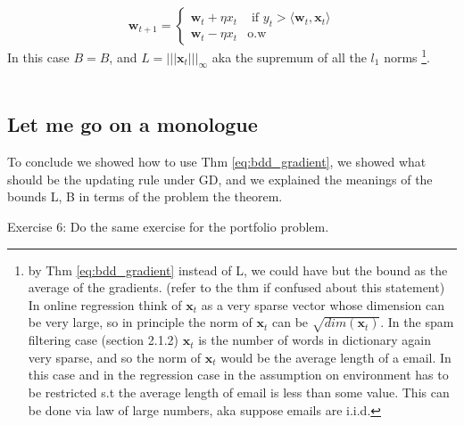 \documentclass[11pt]{article}
\theoremstyle{quest}
\begin{document}
\begin{tcolorbox}
$$\mathbf{w}_{t+1}=\begin{cases} \mathbf{w}_t +\eta x_t   & \text{ if } y_t > \langle \mathbf{w}_t, \mathbf{x}_t \rangle\\
 \mathbf{w}_t -\eta x_t  & \text{o.w}
\end{cases}$$
In this case $B=B$, and $L = |||\mathbf{x}_t|||_\infty$ aka the supremum of all the $l_1$ norms \footnote{by {\color{blue} Thm \eqref{eq:bdd_gradient}} instead of L, we could have but the bound as the average of the gradients. (refer to the thm if confused about this statement) In online regression think of $\mathbf{x}_t$ as a very sparse vector whose dimension can be very large, so in principle the norm of $\mathbf{x}_t$ can be $\sqrt{dim(\mathbf{x}_t)}$. In the spam filtering case (section 2.1.2) $\mathbf{x}_t$ is the number of words in dictionary again very sparse, and so the norm of $\mathbf{x}_t$ would be the average length of a email. In this case and in the regression case in the assumption on environment has to be restricted s.t the average length of email is less than some value. This can be done via law of large numbers, aka suppose emails are i.i.d. }. \\ \\ 

\end{tcolorbox}

\subsection{Let me go on a monologue}
To conclude we showed how to use {\color{blue} Thm \eqref{eq:bdd_gradient}}, we showed what should be the updating rule under  GD, and we explained the meanings of the bounds L, B in terms of the problem the theorem.  \\

\begin{tcolorbox}
Exercise 6: Do the same exercise for the portfolio problem. 
\end{tcolorbox}
\end{document}

